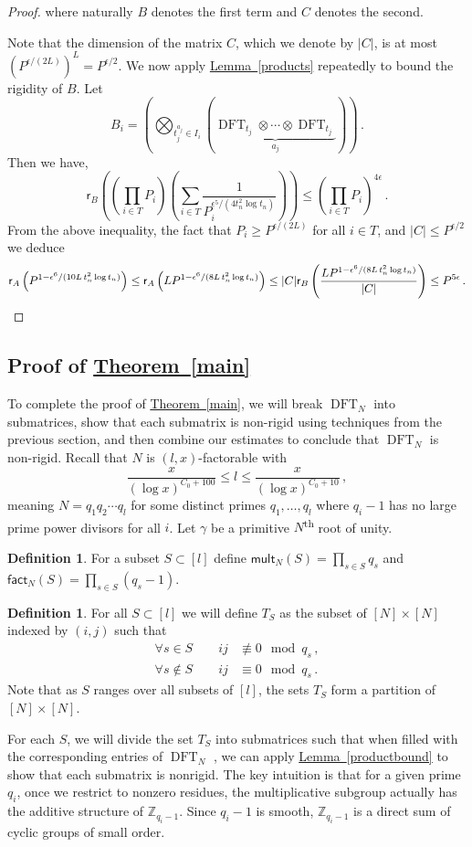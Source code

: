 \documentclass[11pt]{article}
\numberwithin{equation}{section}
\theoremstyle{definition}
\theoremstyle{plain}
\newcommand{\Z}{\mathbb Z}
\newcommand{\expref}[2]{\hyperref[#2]{#1~\ref{#2}}}
\theoremstyle{definition}
\newtheorem{define}[theorem]{Definition}
\renewcommand\Z{{\mathbb{Z}}}
\renewcommand\fact{\textsf{fact}}
\newcommand\mult{\textsf{mult}}
\newcommand{\ts}{\textsuperscript}
\DeclareMathOperator{\DFT}{DFT}
\begin{document}
\begin{proof}
\noindent where naturally $B$ denotes the first term and $C$ denotes the second.

Note that the dimension of the matrix $C$, which we denote by $|C|$, is at most $\left( P^{\epsilon/(2L)} \right)^L = P^{\epsilon/2}$.  We now apply \expref{Lemma}{products} repeatedly to bound the rigidity of $B$.  Let %
%
\[B_i = \left(\bigotimes_{t_j^{a_j} \in I_i} (\underbrace{\DFT_{t_j} \otimes \cdots \otimes \DFT_{t_j}}_\text{$a_j$})\right) \,.\]
%
Then we have,
\[
\textsf{r}_B\left( \left(\prod_{i \in T}P_i \right) \left(\sum_{i \in T} \frac{1}{P_i^{\epsilon^5/(4t_n^2 \log t_n)}}\right)\right) \leq \left(\prod_{i \in T}P_i\right)^{4 \epsilon} \,.
\]
{}From the above inequality, the fact that $P_i \geq P^{\epsilon/(2L)}$ for all $i \in T$, and $|C| \leq P^{\epsilon/2}$ we deduce
\[
\textsf{r}_A\left( P^{1 - \epsilon^6/(10L\,t_n^2 \log t_n)}\right) \leq \textsf{r}_A\left( LP^{1 - \epsilon^6/(8L\,t_n^2 \log t_n)}\right)  \leq |C|\textsf{r}_B\left( \frac{ LP^{1 - \epsilon^6/(8L\,t_n^2 \log t_n)}}{|C|}\right)   \leq P^{5 \epsilon} \,. \qedhere
\]
\end{proof}


\subsection{Proof of \expref{Theorem}{main}}
To complete the proof of \expref{Theorem}{main}, we will break %
$\DFT_N$ %
into submatrices, show that each submatrix is non-rigid using techniques from the previous section, and then combine our estimates to conclude that %
$\DFT_N$ %
 is non-rigid.  Recall that $N$ is $(l,x)$-factorable with 
 \[\frac{x}{(\log x)^{C_0 + 100}} \leq l \leq\frac{x}{(\log x)^{C_0+10}} \,,\] meaning $N = q_1q_2 \cdots q_l$ for some distinct primes $q_1, \dots , q_l$ where $q_i - 1$ has no large prime power divisors for all $i$.  Let $\gamma$ be a primitive $N$\ts{th} root of unity.
\begin{define}\label{def_multandfact}
For a subset $S \subset [l]$ define $\mult_N(S) =  \prod_{s \in S} q_s$ and $\fact_N(S) = \prod_{s \in S} (q_s-1)$.
\end{define} 
\begin{define} For all $S \subset [l]$ we will define $T_S$ as the subset of $[N] \times [N]$ indexed by $(i,j)$ such that 
%
\begin{align*}
\forall s \in S \qquad ij &\not\equiv 0 \mod q_s \,, \\
\forall s \notin S \qquad ij &\equiv 0 \mod q_s  \,.
\end{align*}
Note that as $S$ ranges over all subsets of $[l]$, the sets $T_S$ form a partition of $[N] \times [N]$.
\end{define}
For each $S$, we will divide the set $T_S$ into submatrices such that when filled with the corresponding entries of %
$\DFT_N$ %
, we can apply \expref{Lemma}{productbound} to show that each submatrix is nonrigid.  The key intuition is that for a given prime $q_i$, once we restrict to nonzero residues, the multiplicative subgroup actually has the additive structure of $\Z_{q_i - 1}$.  Since $q_i - 1$ is smooth, $\Z_{q_i - 1}$ is a direct sum of cyclic groups of small order.
\end{document}
